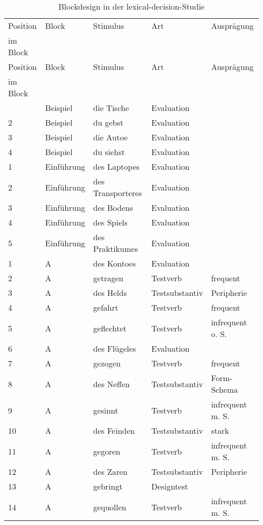 \begin{small}
\begin{longtable}{lllll}
\caption{Blockdesign in der lexical-decision-Studie\label{ablauflexta}}\\
\lsptoprule Position & Block & Stimulus & Art & Ausprägung \\ im Block \\ \midrule\endfirsthead
\midrule Position & Block & Stimulus & Art & Ausprägung \\ im Block \\ \midrule\endhead
\endfoot\lspbottomrule\endlastfoot
 1 & Beispiel & die Tische & Evaluation & \\ 
 2 & Beispiel & du gebst & Evaluation &  \\ 
 3 & Beispiel & die Autoe & Evaluation &  \\ 
 4 & Beispiel & du siehst & Evaluation &  \\ 
	\midrule
 1 & Einführung & des Laptopes & Evaluation &  \\ 
  2 & Einführung & des Transporteres & Evaluation &  \\ 
 3 & Einführung & des Bodens & Evaluation &  \\ 
 4 & Einführung & des Spiels & Evaluation &  \\ 
   5 & Einführung & des Praktikumes & Evaluation &  \\ 
		\midrule
   1 & A & des Kontoes & Evaluation &  \\ 
   2 & A & getragen & Testverb & frequent \\ 
  3 & A & des Helds & Testsubstantiv & Peripherie \\ 
 4 & A & gefahrt & Testverb & frequent \\ 
  5 & A & geflechtet & Testverb & infrequent o. S. \\ 
   6 & A & des Flügeles & Evaluation &  \\ 
   7 & A & gezogen & Testverb & frequent \\ 
   8 & A & des Neffen & Testsubstantiv & Form-Schema \\ 
   9 & A & gesinnt & Testverb & infrequent m. S. \\ 
 10 & A & des Feinden & Testsubstantiv & stark \\ 
   11 & A & gegoren & Testverb & infrequent m. S. \\ 
12 & A & des Zaren & Testsubstantiv & Peripherie \\ 
 13 & A & gebringt & Designtest &  \\ 
 14 & A & gequollen & Testverb & infrequent m. S. \\ 

\end{longtable}
\end{small}
